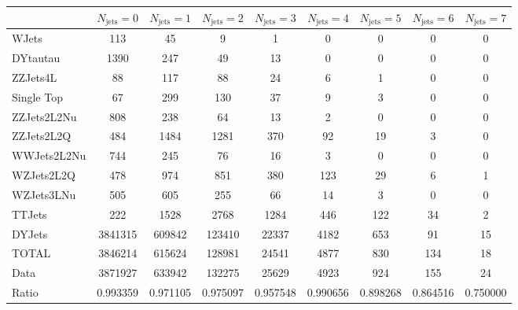 \footnotesize{
\begin{tabular}{l|cccccccc} 
  &  $N_{\text{jets}} = 0 $ & $N_{\text{jets}} = 1 $ & $N_{\text{jets}} = 2 $ & $N_{\text{jets}} = 3 $ & $N_{\text{jets}} = 4 $ & $N_{\text{jets}} = 5 $ & $N_{\text{jets}} = 6 $ & $N_{\text{jets}} = 7$ \\ \hline 
   WJets        & 113 & 45 & 9 & 1 & 0 & 0 & 0 & 0 \\ 
   DYtautau        & 1390 & 247 & 49 & 13 & 0 & 0 & 0 & 0 \\ 
   ZZJets4L        & 88 & 117 & 88 & 24 & 6 & 1 & 0 & 0 \\ 
   Single Top        & 67 & 299 & 130 & 37 & 9 & 3 & 0 & 0 \\ 
   ZZJets2L2Nu        & 808 & 238 & 64 & 13 & 2 & 0 & 0 & 0 \\ 
   ZZJets2L2Q        & 484 & 1484 & 1281 & 370 & 92 & 19 & 3 & 0 \\ 
   WWJets2L2Nu        & 744 & 245 & 76 & 16 & 3 & 0 & 0 & 0 \\ 
   WZJets2L2Q        & 478 & 974 & 851 & 380 & 123 & 29 & 6 & 1 \\ 
   WZJets3LNu        & 505 & 605 & 255 & 66 & 14 & 3 & 0 & 0 \\ 
   TTJets        & 222 & 1528 & 2768 & 1284 & 446 & 122 & 34 & 2 \\ 
   DYJets        & 3841315 & 609842 & 123410 & 22337 & 4182 & 653 & 91 & 15 \\ 
 \hline 
 TOTAL & 3846214 & 615624 & 128981 & 24541 & 4877 & 830 & 134 & 18 \\ 
 \hline 
 Data          & 3871927 & 633942 & 132275 & 25629 & 4923 & 924 & 155 & 24 \\ 
  Ratio          & 0.993359 & 0.971105 & 0.975097 & 0.957548 & 0.990656 & 0.898268 & 0.864516 & 0.750000 \\ 
 \end{tabular}}